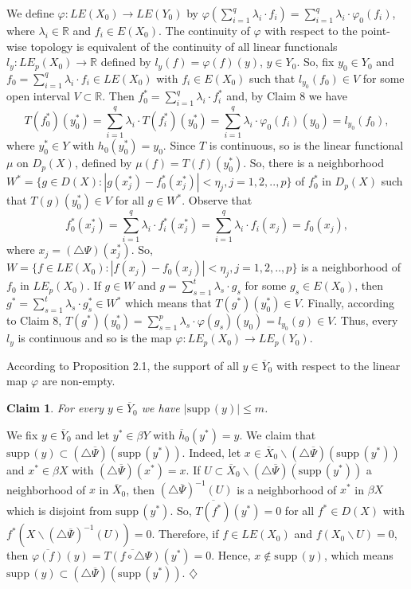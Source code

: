 \documentclass[12pt]{amsart}
\newtheorem{claim}{Claim}
\def\supp{{\mathrm {supp}}\,}
\begin{document}
We define $\varphi:LE(X_0)\to LE(Y_0)$ by 
$\varphi(\sum_{i=1}^q\lambda_i\cdot f_i)=\sum_{i=1}^q\lambda_i\cdot\varphi_0(f_i)$, where $\lambda_i\in\mathbb R$ and $f_i\in E(X_0)$. The continuity of $\varphi$ with respect to the point-wise topology is equivalent of the continuity of all linear functionals $l_y:LE_p(X_0)\to \mathbb R$ defined by $l_y(f)=\varphi(f)(y)$, $y\in Y_0$.
So, fix $y_0\in Y_0$ and $f_0=\sum_{i=1}^q\lambda_i\cdot f_i\in LE(X_0)$ with $f_i\in E(X_0)$ such that $l_{y_0}(f_0)\in V$ for some open interval $V\subset\mathbb R$. Then $f_0^*=\sum_{i=1}^q\lambda_i\cdot f_i^*$ and, by Claim 8 we have
$$T(f_0^*)(y_0^*)=\sum_{i=1}^q\lambda_i\cdot T(f_i^*)(y_0^*)=\sum_{i=1}^q\lambda_i\cdot\varphi_0(f_i)(y_0)=l_{y_0}(f_0),$$
where $y_0^*\in Y$ with $h_0(y_0^*)=y_0$.
Since $T$ is continuous, so is the linear functional $\mu$ on $D_p(X)$, defined by $\mu(f)=T(f)(y_0^*)$. So, there is a neighborhood $W^*=\{g\in D(X):|g(x_j^*)-f_0^*(x_j^*)|<\eta_j, j=1,2,..,p\}$ of $f_0^*$ in $D_p(X)$ such that $T(g)(y_0^*)\in V$ for all $g\in W^*$. Observe that 
$$f_0^*(x_j^*)=\sum_{i=1}^q\lambda_i\cdot f_i^*(x_j^*)=\sum_{i=1}^q\lambda_i\cdot f_i(x_j)=f_0(x_j),$$
where $x_j=(\triangle\Psi)(x_j^*)$. So, $W=\{f\in LE(X_0):|f(x_j)-f_0(x_j)|<\eta_j,j=1,2,..,p\}$ is a neighborhood of $f_0$ in $LE_p(X_0)$. If $g\in W$ and 
$g=\sum_{s=1}^t\lambda_s\cdot g_s$ for some $g_s\in E(X_0)$, then $g^*=\sum_{s=1}^t\lambda_s\cdot g_s^*\in W^*$ which means that
$T(g^*)(y_0^*)\in V$. Finally, according to Claim 8, $T(g^*)(y_0^*)=\sum_{s=1}^p\lambda_s\cdot\varphi(g_s)(y_0)=l_{y_0}(g)\in V$.
Thus, every $l_y$ is continuous and so is the map $\varphi:LE_p(X_0)\to LE_p(Y_0)$.

According to Proposition 2.1, the support of all $y\in\overline Y_0$ with respect to the linear map $\varphi$ are non-empty. 
\begin{claim}
For every $y\in\overline Y_0$ we have $|\supp(y)|\leq m$. %
\end{claim}
We fix $y\in\overline Y_0$ and let $y^*\in\beta Y$ with $\overline h_0(y^*)=y$. We claim that $\supp(y)\subset (\triangle\overline\Psi)(\supp(y^*))$. Indeed, let $x\in\overline X_0\backslash (\triangle\overline\Psi)(\supp(y^*))$ and $x^*\in\beta X$ with $(\triangle\overline\Psi)(x^*)=x$.  If $U\subset\overline X_0\backslash(\triangle\overline\Psi)(\supp(y^*))$ a 
neighborhood of $x$ in $\overline X_0$, then $(\triangle\overline\Psi)^{-1}(U)$ is a neighborhood of $x^*$ in $\beta X$ which is disjoint from $\supp(y^*)$. So, $\overline{T(f^*)}(y^*)=0$ for all $f^*\in D(X)$ with $f^*(X\backslash (\triangle\overline\Psi)^{-1}(U))=0$. Therefore, if $f\in LE(X_0)$ and $f(X_0\backslash U)=0$, then $\overline{\varphi(f)}(y)=\overline{T(f\circ\triangle\Psi)}(y^*)=0$. Hence, $x\not\in\supp(y)$, which means $\supp(y)\subset (\triangle\overline\Psi)(\supp(y^*))$.  $\diamondsuit$
\end{document}
